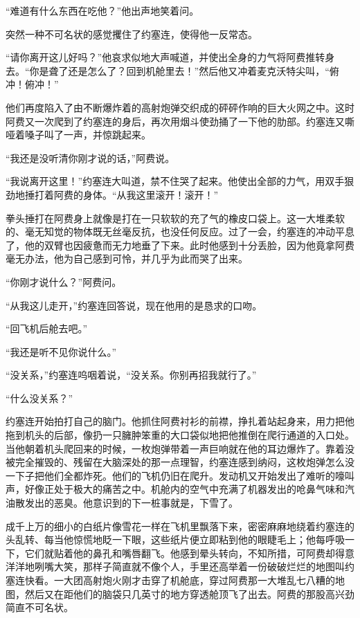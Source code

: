     “难道有什么东西在吃他？”他出声地笑着问。

    突然一种不可名状的感觉攫住了约塞连，使得他一反常态。

    “请你离开这儿好吗？”他哀求似地大声喊道，并使出全身的力气将阿费推转身去。“你是聋了还是怎么了？回到机舱里去！”然后他又冲着麦克沃特尖叫，“俯冲！俯冲！”

    他们再度陷入了由不断爆炸着的高射炮弹交织成的砰砰作响的巨大火网之中。这时阿费又一次爬到了约塞连的身后，再次用烟斗使劲捅了一下他的肋部。约塞连又嘶哑着嗓子叫了一声，并惊跳起来。

    “我还是没听清你刚才说的话，”阿费说。

    “我说离开这里！”约塞连大叫道，禁不住哭了起来。他使出全部的力气，用双手狠劲地捶打着阿费的身体。“从我这里滚开！滚开！”

    拳头捶打在阿费身上就像是打在一只软软的充了气的橡皮口袋上。这一大堆柔软的、毫无知觉的物体既无丝毫反抗，也没任何反应。过了一会，约塞连的冲动平息了，他的双臂也因疲惫而无力地垂了下来。此时他感到十分丢脸，因为他竟拿阿费毫无办法，他为自己感到可怜，并几乎为此而哭了出来。

    “你刚才说什么？”阿费问。

    “从我这儿走开，”约塞连回答说，现在他用的是恳求的口吻。

    “回飞机后舱去吧。”

    “我还是听不见你说什么。”

    “没关系，”约塞连呜咽着说，“没关系。你别再招我就行了。”

    “什么没关系？”

    约塞连开始拍打自己的脑门。他抓住阿费衬衫的前襟，挣扎着站起身来，用力把他拖到机头的后部，像扔一只臃肿笨重的大口袋似地把他推倒在爬行通道的入口处。当他朝着机头爬回来的时候，一枚炮弹带着一声巨响就在他的耳边爆炸了。靠着没被完全摧毁的、残留在大脑深处的那一点理智，约塞连感到纳闷，这枚炮弹怎么没一下子把他们全都炸死。他们的飞机仍旧在爬升。发动机又开始发出了难听的嚎叫声，好像正处于极大的痛苦之中。机舱内的空气中充满了机器发出的呛鼻气味和汽油散发出的恶臭。他意识到的下一桩事就是，下雪了。

    成千上万的细小的白纸片像雪花一样在飞机里飘落下来，密密麻麻地绕着约塞连的头乱转、每当他惊慌地眨一下眼，这些纸片便立即粘到他的眼睫毛上；他每呼吸一下，它们就贴着他的鼻孔和嘴唇翻飞。他感到晕头转向，不知所措，可阿费却得意洋洋地咧嘴大笑，那样子简直就不像个人，手里还高举着一份破破烂烂的地图叫约塞连快看。一大团高射炮火刚才击穿了机舱底，穿过阿费那一大堆乱七八糟的地图，然后又在距他们的脑袋只几英寸的地方穿透舱顶飞了出去。阿费的那股高兴劲简直不可名状。
 


